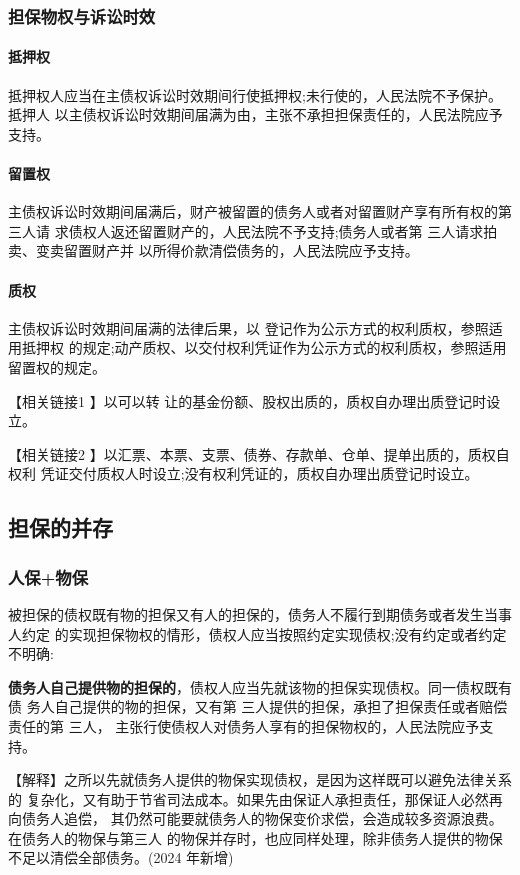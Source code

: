 \documentclass[UTF8,12pt]{ctexart}
\numberwithin{equation}{section} %
\numberwithin{figure}{section}
\numberwithin{table}{section}
\begin{document}
	
	\subsubsection{担保物权与诉讼时效}
	
	\paragraph{抵押权} 抵押权人应当在主债权诉讼时效期间行使抵押权;未行使的，人民法院不予保护。抵押人 以主债权诉讼时效期间届满为由，主张不承担担保责任的，人民法院应予支持。
	
	\paragraph{留置权 }主债权诉讼时效期间届满后，财产被留置的债务人或者对留置财产享有所有权的第三人请 求债权人返还留置财产的，人民法院不予支持;债务人或者第 三人请求拍卖、变卖留置财产并 以所得价款清偿债务的，人民法院应予支持。
	
	\paragraph{质权}
	主债权诉讼时效期间届满的法律后果，以 登记作为公示方式的权利质权，参照适用抵押权 的规定;动产质权、以交付权利凭证作为公示方式的权利质权，参照适用留置权的规定。
	
	【相关链接1 】以可以转 让的基金份额、股权出质的，质权自办理出质登记时设立。 
	
	【相关链接2 】以汇票、本票、支票、债券、存款单、仓单、提单出质的，质权自权利 凭证交付质权人时设立;没有权利凭证的，质权自办理出质登记时设立。
	
	\subsection{担保的并存}
	
	\subsubsection{人保+物保}
	被担保的债权既有物的担保又有人的担保的，债务人不履行到期债务或者发生当事人约定 的实现担保物权的情形，债权人应当按照约定实现债权;没有约定或者约定不明确:
	
	\textbf{债务人自己提供物的担保的}，债权人应当先就该物的担保实现债权。同一债权既有债 务人自己提供的物的担保，又有第 三人提供的担保，承担了担保责任或者赔偿责任的第 三人， 主张行使债权人对债务人享有的担保物权的，人民法院应予支持。
	
	【解释】之所以先就债务人提供的物保实现债权，是因为这样既可以避免法律关系的 复杂化，又有助于节省司法成本。如果先由保证人承担责任，那保证人必然再向债务人追偿， 其仍然可能要就债务人的物保变价求偿，会造成较多资源浪费。在债务人的物保与第三人 的物保并存时，也应同样处理，除非债务人提供的物保不足以清偿全部债务。(2024 年新增)
	
\end{document}
